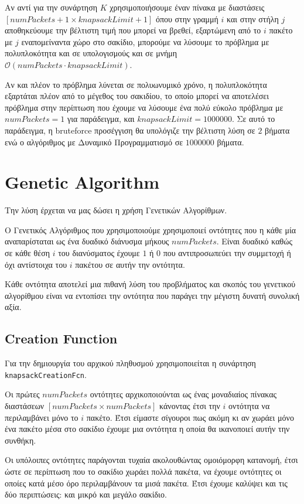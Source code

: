 \documentclass{article}
\begin{document}
Αν αντί για την συνάρτηση $K$ χρησιμοποιήσουμε έναν πίνακα με διαστάσεις
$\left[numPackets+1 \times knapsackLimit+1\right]$ όπου στην γραμμή $i$ και στην
στήλη $j$ αποθηκεύουμε την βέλτιστη τιμή που μπορεί να βρεθεί, εξαρτώμενη από το
$i$ πακέτο με $j$ εναπομείναντα χώρο στο σακίδιο, μπορούμε να λύσουμε το
πρόβλημα με πολυπλοκότητα και σε υπολογισμούς και σε μνήμη
$\mathcal{O}\left(numPackets \cdot knapsackLimit\right)$.

Αν και πλέον το πρόβλημα λύνεται σε πολυωνυμικό χρόνο, η πολυπλοκότητα εξαρτάται
πλέον από το μέγεθος του σακιδίου, το οποίο μπορεί να αποτελέσει πρόβλημα στην
περίπτωση που έχουμε να λύσουμε ένα πολύ εύκολο πρόβλημα με $numPackets=1$ για
παράδειγμα, και $knapsackLimit=1000000$. Σε αυτό το παράδειγμα, η bruteforce
προσέγγιση θα υπολόγιζε την βέλτιστη λύση σε $2$ βήματα ενώ ο αλγόριθμος με
Δυναμικό Προγραμματισμό σε $1000000$ βήματα.

\section{Genetic Algorithm}

Την λύση έρχεται να μας δώσει η χρήση Γενετικών Αλγορίθμων.

Ο Γενετικός Αλγόριθμος που χρησιμοποιούμε χρησιμοποιεί οντότητες που η κάθε μία
αναπαρίσταται ως ένα δυαδικό διάνυσμα μήκους $numPackets$. Είναι δυαδικό καθώς
σε κάθε θέση $i$ του διανύσματος έχουμε $1$ ή $0$ που αντιπροσωπεύει την
συμμετοχή ή όχι αντίστοιχα του $i$ πακέτου σε αυτήν την οντότητα.

Κάθε οντότητα αποτελεί μια πιθανή λύση του προβλήματος και σκοπός του γενετικού
αλγορίθμου είναι να εντοπίσει την οντότητα που παράγει την μέγιστη δυνατή
συνολική αξία.

\subsection{Creation Function}

Για την δημιουργία του αρχικού πληθυσμού χρησιμοποιείται η συνάρτηση
\verb|knapsackCreationFcn|.

Οι πρώτες $numPackets$ οντότητες αρχικοποιούνται ως ένας μοναδιαίος πίνακας
διαστάσεων $\left[numPackets \times numPackets\right]$ κάνοντας έτσι την $i$
οντότητα να περιλαμβάνει μόνο το $i$ πακέτο. Έτσι είμαστε σίγουροι πως ακόμη κι
αν χωράει μόνο ένα πακέτο μέσα στο σακίδιο έχουμε μια οντότητα η οποία θα
ικανοποιεί αυτήν την συνθήκη.

Οι υπόλοιπες οντότητες παράγονται τυχαία ακολουθώντας ομοιόμορφη κατανομή, έτσι
ώστε σε περίπτωση που το σακίδιο χωράει πολλά πακέτα, να έχουμε οντότητες οι
οποίες κατά μέσο όρο περιλαμβάνουν τα μισά πακέτα. Έτσι έχουμε καλύψει και τις
δύο περιπτώσεις: και μικρό και μεγάλο σακίδιο.
\end{document}
